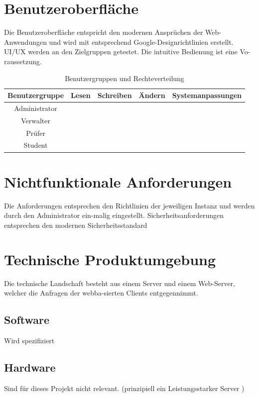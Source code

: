 	
	\section{Benutzeroberfläche}
	
	Die Benutzeroberfläche entspricht den modernen Ansprüchen der Web-Anwendungen und wird mit entsprechend Google-Designrichtlinien erstellt. UI/UX werden an den Zielgruppen getestet. Die intuitive Bedienung ist eine Vo-raussetzung.
	
	\begin{table}[ht]
	\caption{Benutzergruppen und Rechteverteilung}
	\begin{tabular}{|c|c|c|c|c|}
	\hline Benutzergruppe & Lesen & Schreiben & Ändern & Systemanpassungen \\ 
	\hline Administrator & \checkmark & \checkmark & \checkmark & \checkmark \\ 
	\hline Verwalter & \checkmark & \checkmark & \checkmark &  \\ 
	\hline Prüfer & \checkmark & \checkmark &  &  \\ 
	\hline Student & \checkmark &  &  &  \\ 
	\hline 
	\end{tabular} 
	\label{tab:usergroup}
	\end{table}
	
	
	\section{Nichtfunktionale Anforderungen}
	Die Anforderungen entsprechen den Richtlinien der jeweiligen Instanz und werden durch den Administrator ein-malig eingestellt.
	Sicherheitsanforderungen entsprechen den modernen Sicherheitsstandard
	
	\section{Technische Produktumgebung}
	Die technische Landschaft besteht aus einem Server und einem Web-Server, welcher die Anfragen der webba-sierten Clients entgegennimmt. 
		\subsection{Software}
		Wird spezifiziert 
		\subsection{Hardware}
		Sind für dieses Projekt nicht relevant. (prinzipiell ein Leistungsstarker Server )
